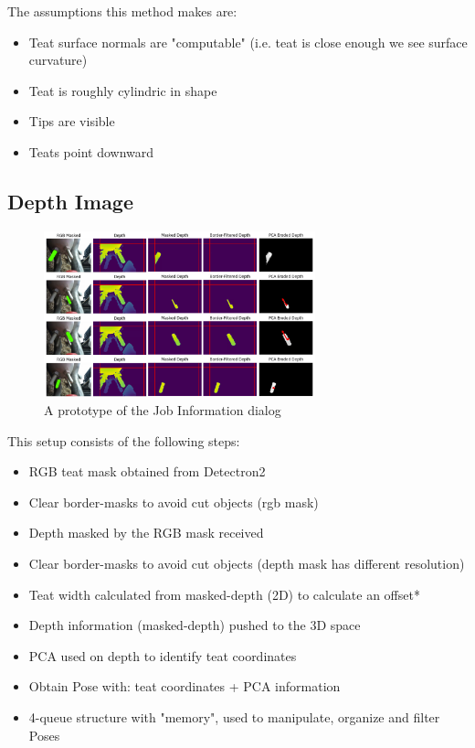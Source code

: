    The assumptions this method makes are:
        \begin{itemize}
        \item Teat surface normals are "computable" (i.e. teat is close enough we see surface curvature)
        \item Teat is roughly cylindric in shape
        \item Tips are visible
        \item Teats point downward
        \end{itemize}
   \lipsum[2-3]

    
    \subsection{Depth Image}
    \begin{figure}[!ht]
        \centering
        \includegraphics[width=0.7\textwidth]{images/cow_segment.png}
        \caption{A prototype of the Job Information dialog}
        \label{fig:cow_fmc}
    \end{figure}
    \lipsum[2-3]
    This setup consists of the following steps:
        \begin{itemize}
        \item RGB teat mask obtained from Detectron2
        \item Clear border-masks to avoid cut objects (rgb mask)
        \item Depth masked by the RGB mask received
        \item Clear border-masks to avoid cut objects (depth mask has different resolution)
        \item Teat width calculated from masked-depth (2D) to calculate an offset*
        \item Depth information (masked-depth) pushed to the 3D space
        \item PCA used on depth to identify teat coordinates
        \item Obtain Pose with: teat coordinates + PCA information 
        \item 4-queue structure with "memory", used to manipulate, organize and filter Poses
        \end{itemize}
    
